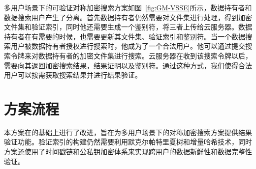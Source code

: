 多用户场景下的可验证对称加密搜索方案\multi 如图~\ref{fig:GM-VSSE}所示，数据持有者和数据搜索用户产生了分离。首先数据持有者仍然需要对文件集进行处理，得到加密文件集和验证索引，同时他还需要生成一个鉴别符，将三者上传给云服务器。数据持有者在有需要的时候，也需要更新其文件集、验证索引和鉴别符。当一个数据搜索用户被数据持有者授权进行搜索时，他成为了一个合法用户。他可以通过提交搜索令牌来对数据持有者的加密文件集进行搜索。云服务器在收到该搜索令牌以后，需要向其返回加密搜索结果，结果证明以及鉴别符。通过这种方式，我们使得合法用户可以按需获取搜索结果并进行结果验证。


\section{方案流程}
本方案在\single 的基础上进行了改进，旨在为多用户场景下的对称加密搜索方案提供结果验证功能。验证索引的构建仍然需要利用默克尔帕特里夏树和增量哈希技术，同时\multi 方案还使用了时间戳链和公私钥加密体系来实现跨用户的数据新鲜性和数据完整性验证。

